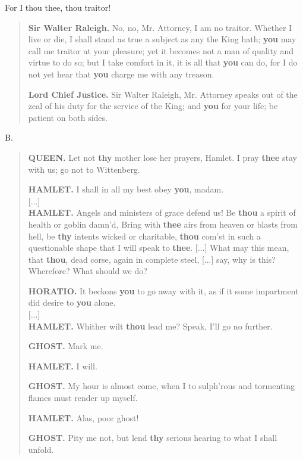 \begin{exercises}{For I thou thee, thou traitor!}
\begin{quote}
    \textbf{Sir Walter Raleigh.} No, no, Mr. Attorney, I am no traitor. Whether I live or die, I shall stand as true a subject as any the King hath; \textbf{you} may call me traitor at your pleasure; yet it becomes not a man of quality and virtue to do so; but I take comfort in it, it is all that \textbf{you} can do, for I do not yet hear that \textbf{you} charge me with any treason.
    
    \textbf{Lord Chief Justice.} Sir Walter Raleigh, Mr. Attorney speaks out of the zeal of his duty for the service of the King; and \textbf{you} for your life; be patient on both sides.
\end{quote}

\noindent B.
\begin{quote}
    \textbf{QUEEN.} Let not \textbf{thy} mother lose her prayers, Hamlet. I pray \textbf{thee} stay with us; go not to Wittenberg.
    
    \textbf{HAMLET.} I shall in all my best obey \textbf{you}, madam.\\

    [...]\\

    \textbf{HAMLET.} Angels and ministers of grace defend us! Be \textbf{thou} a spirit of health or goblin damn'd, Bring with \textbf{thee} airs from heaven or blasts from hell, be \textbf{thy} intents wicked or charitable, \textbf{thou} com'st in such a questionable shape that I will speak to \textbf{thee}. [...] What may this mean, that \textbf{thou}, dead corse, again in complete steel, [...] say, why is this? Wherefore? What should we do?
    
    \textbf{HORATIO.} It beckons \textbf{you} to go away with it, as if it some impartment did desire to \textbf{you} alone.\\

    [...]\\

    \textbf{HAMLET.} Whither wilt \textbf{thou} lead me? Speak, I'll go no further.
    
    \textbf{GHOST.} Mark me.
    
    \textbf{HAMLET.} I will.
    
    \textbf{GHOST.} My hour is almost come, when I to sulph'rous and tormenting flames must render up myself.
    
    \textbf{HAMLET.} Alas, poor ghost!
    
    \textbf{GHOST.} Pity me not, but lend \textbf{thy} serious hearing to what I shall unfold.


\end{quote}
\end{exercises}
